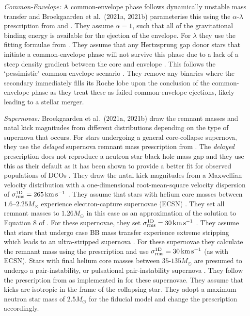 \textit{Common-Envelope:} A common-envelope phase follows dynamically unstable mass transfer and Broekgaarden et al.\ (2021a, 2021b) parameterise this using the $\alpha$-$\lambda$ prescription from \citet{Webbink+1984} and \citet{deKool+1990}. They assume $\alpha = 1$, such that all of the gravitational binding energy is available for the ejection of the envelope. For $\lambda$ they use the fitting formulae from \citet{Xu+2010, Xu+2010a}. They assume that any Hertzsprung gap donor stars that initiate a common-envelope phase will not survive this phase due to a lack of a steep density gradient between the core and envelope \citep{Taam+2000, Ivanova+2004, Klencki+2021}. This follows the `pessimistic' common-envelope scenario \citep[c.f.][]{Belczynski+2007}. They remove any binaries where the secondary immediately fills its Roche lobe upon the conclusion of the common-envelope phase as they treat these as failed common-envelope ejections, likely leading to a stellar merger.

\textit{Supernovae:} Broekgaarden et al.\ (2021a, 2021b) draw the remnant masses and natal kick magnitudes from different distributions depending on the type of supernova that occurs. For stars undergoing a general core-collapse supernova, they use the \textit{delayed} supernova remnant mass prescription from \citet{Fryer+2012}. The \textit{delayed} prescription does not reproduce a neutron star black hole mass gap and they use this as their default as it has been shown to provide a better fit for observed populations of DCOs \citep[e.g.][]{Vigna-Gomez+2018}. They draw the natal kick magnitudes from a Maxwellian velocity distribution with a one-dimensional root-mean-square velocity dispersion of $\sigma_{\rm rms}^{\rm 1D} = 265 \unit{km}{s^{-1}}$ \citep{Lyne+1994, Hobbs+2005}. They assume that stars with helium core masses between $1.6$--$2.25 \unit{M_{\odot}}$ \citep{Hurley+2002} experience electron-capture supernovae (ECSN) \citep{Nomoto+1984, Nomoto+1987, Ivanova+2008}. They set all remnant masses to $1.26 \unit{M_{\odot}}$ in this case as an approximation of the solution to Equation 8 of \citet{Timmes+1996}. For these supernovae, they set $\sigma_{\rm rms}^{\rm 1D} = 30 \unit{km}{s^{-1}}$ \citep[e.g.][]{Pfahl+2002, Podsiadlowski+2004}. They assume that stars that undergo case BB mass transfer \citep{Dewi+2002} experience extreme stripping which leads to an ultra-stripped supernova \citep{Tauris+2013, Tauris+2015}. For these supernovae they calculate the remnant mass using the \citet{Fryer+2012} prescription and use $\sigma_{\rm rms}^{\rm 1D} = 30 \unit{km}{s^{-1}}$ (as with ECSN). Stars with final helium core masses between $35$-$135 \unit{M_{\odot}}$ are presumed to undergo a pair-instability, or pulsational pair-instability supernova \citep[e.g.][]{Woosley+2007, Farmer+2019}. They follow the prescription from \citet{Marchant+2019} as implemented in \citep{Stevenson+2019} for these supernovae. They assume that kicks are isotropic in the frame of the collapsing star. They adopt a maximum neutron star mass of $2.5 \unit{M_{\odot}}$ \citep[e.g.][]{Kalogera+1996, Fryer+2015, Margalit+2017} for the fiducial model and change the \citet{Fryer+2012} prescription accordingly.

